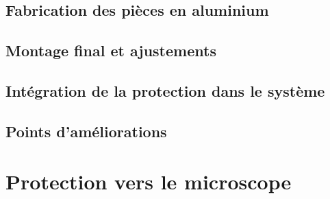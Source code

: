 \subsection{Fabrication des pièces en aluminium}

\subsection{Montage final et ajustements}

\subsection{Intégration de la protection dans le système}

\subsection{Points d'améliorations}



\section{Protection vers le microscope}

